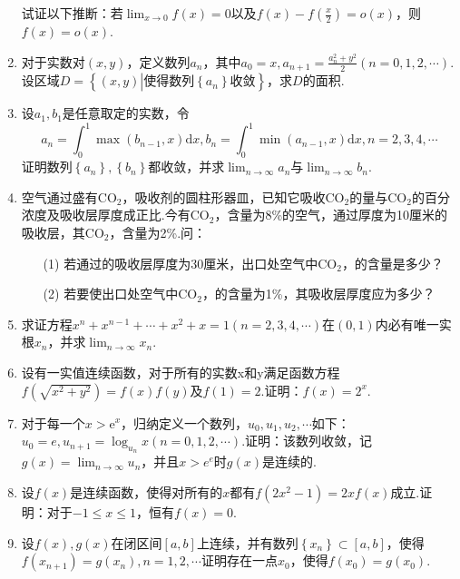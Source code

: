 \begin{enumerate}
试证以下推断：若$\lim _ { x \rightarrow 0 } f ( x ) = 0$以及$f ( x ) - f \left( \frac { x } { 2 } \right) = o ( x )$，则$f(x)=o(x)$.
\item 对于实数对$(x,y)$，定义数列${a_{n}}$，其中$a _ { 0 } = x , a _ { n + 1 } = \frac { a _ { n } ^ { 2 } + y ^ { 2 } } { 2 } ( n = 0,1,2 , \cdots )$.设区域$D=\left\{\left(x,y\right)\left|\textrm{使得数列}\left\{a_n\right\}\textrm{收敛}\right.\right\}$，求$D$的面积.
\item 设$a_{1},b_{1}$是任意取定的实数，令
\[a _ { n } = \int _ { 0 } ^ { 1 } \max \left( b _ { n - 1 } , x \right) \mathrm { d } x , b _ { n } = \int _ { 0 } ^ { 1 } \min \left( a _ { n - 1 } , x \right) \mathrm { d } x , n = 2,3,4 , \cdots\]
证明数列$\left\{ a _ { n } \right\} , \left\{ b _ { n } \right\}$都收敛，并求$\lim _ { n \rightarrow \infty } a _ { n }$与$\lim _ { n \rightarrow \infty } b _ { n }$.
\item 空气通过盛有$\mathrm { CO } _ { 2 }$，吸收剂的圆柱形器皿，已知它吸收$\mathrm { CO } _ { 2 }$的量与$\mathrm { CO } _ { 2 }$的百分浓度及吸收层厚度成正比.今有$\mathrm { CO } _ { 2 }$，含量为8\%的空气，通过厚度为10厘米的吸收层，其$\mathrm { CO } _ { 2 }$，含量为2\%.问：
\begin{enumerate}
	\item[(1)] 若通过的吸收层厚度为30厘米，出口处空气中$\mathrm { CO } _ { 2 }$，的含量是多少？
	\item[(2)] 若要使出口处空气中$\mathrm { CO } _ { 2 }$，的含量为1\%，其吸收层厚度应为多少？
\end{enumerate}
\item 求证方程$x ^ { n } + x ^ { n - 1 } + \cdots + x ^ { 2 } + x = 1 ( n = 2,3,4 , \cdots )$在$(0,1)$内必有唯一实根$x_{n}$，并求$\lim_{ n \rightarrow \infty }x_{n}$.
\item 设有一实值连续函数，对于所有的实数x和y满足函数方程$f \left( \sqrt { x ^ { 2 } + y ^ { 2 } } \right) = f ( x ) f ( y )$及$f(1)=2$.证明：$f(x)=2^{x}$.
\item 对于每一个$x>\mathrm{e}^{x}$，归纳定义一个数列，$u _ { 0 } , u _ { 1 } , u _ { 2 } , \cdots$如下：$u _ { 0 } = e , u _ { n + 1 } = \log _ { u _ { n } } x ( n = 0,1,2 , \cdots )$.证明：该数列收敛，记$g ( x ) = \lim _ { n \rightarrow \infty } u _ { n }$，并且$x>e^{e}$时$g(x)$是连续的.
\item 设$f(x)$是连续函数，使得对所有的$x$都有$f \left( 2 x ^ { 2 } - 1 \right) = 2 x f ( x )$成立.证明：对于$-1\leq x \leq 1$，恒有$f(x)=0$.
\item 设$f(x),g(x)$在闭区间$[a,b]$上连续，并有数列$\left\{ x _ { n } \right\} \subset [ a , b ]$，使得$f \left( x _ { n + 1 } \right) = g \left( x _ { n } \right) , n = 1,2 , \cdots$证明存在一点$x_{0}$，使得$f(x_{0})=g(x_{0})$.

\end{enumerate}
